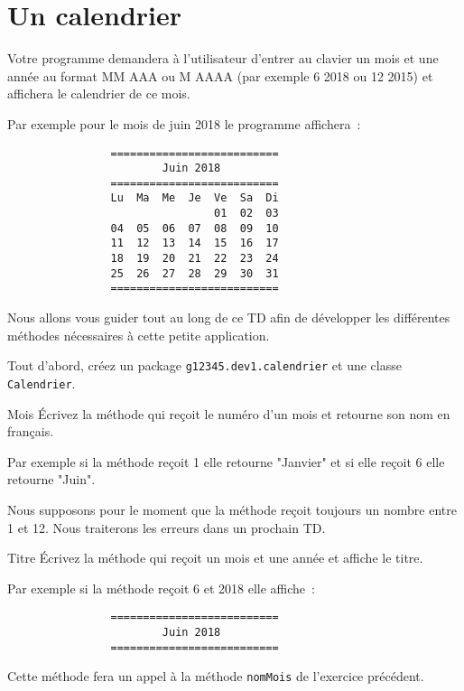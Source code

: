 \documentclass[a4paper,11pt]{style-esi/td}
\begin{document}

\section{Un calendrier}

Votre programme demandera à l'utilisateur d'entrer au clavier un mois et une année 
au format MM AAA ou M AAAA (par exemple 6 2018 ou 12 2015) et affichera le calendrier de ce mois.

Par exemple pour le mois de juin 2018 le programme affichera~: 

\begin{verbatim}
                ==========================
                        Juin 2018
                ========================== 
                Lu  Ma  Me  Je  Ve  Sa  Di
                                01  02  03   
                04  05  06  07  08  09  10   
                11  12  13  14  15  16  17   
                18  19  20  21  22  23  24   
                25  26  27  28  29  30  31      
                ==========================
\end{verbatim}

Nous allons vous guider tout au long de ce TD afin de développer les différentes méthodes nécessaires à cette petite application.

Tout d'abord,
créez un package \texttt{g12345.dev1.calendrier} et une classe \texttt{Calendrier}.


 	\begin{Exercice}{Mois}
		\'Ecrivez la méthode  qui reçoit le numéro d'un mois et retourne son nom en français.
		
		Par exemple si la méthode reçoit 1 elle retourne "Janvier" et si elle reçoit 6 elle retourne "Juin".
		
		Nous supposons pour le moment que la méthode reçoit toujours un nombre entre 1 et 12.
		Nous traiterons les erreurs dans un prochain TD.
	\end{Exercice} 

 
 	\begin{Exercice}{Titre}
		\'Ecrivez la méthode  qui reçoit un mois et une année
		et affiche le titre. 
		
		Par exemple si la méthode reçoit 6 et 2018 elle affiche~:
		\begin{verbatim}
                ==========================
                        Juin 2018
                ========================== 
		\end{verbatim}	
		
		Cette méthode fera un appel à la méthode \texttt{nomMois} de l'exercice précédent.
	\end{Exercice} 
\end{document}
